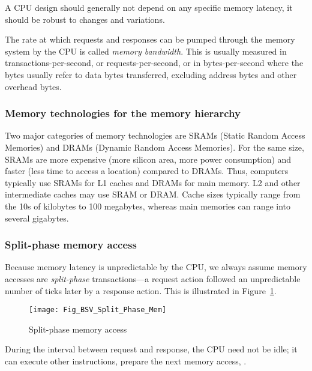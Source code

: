 A CPU design should generally not depend on any specific memory
latency, {\ie} it should be robust to changes and variations.


The rate at which requests and responses can be pumped through the
memory system by the CPU is called \emph{memory bandwidth}.  This is
usually measured in transactions-per-second, or requests-per-second,
or in bytes-per-second where the bytes usually refer to data bytes
transferred, excluding address bytes and other overhead bytes.


\subsubsection{Memory technologies for the memory hierarchy}



Two major categories of memory technologies are SRAMs (Static Random
Access Memories) and DRAMs (Dynamic Random Access Memories).  For the
same size, SRAMs are more expensive (more silicon area, more power
consumption) and faster (less time to access a location) compared to
DRAMs.  Thus, computers typically use SRAMs for L1 caches and DRAMs
for main memory. L2 and other intermediate caches may use SRAM or
DRAM.  Cache sizes typically range from the 10s of kilobytes to 100
megabytes, whereas main memories can range into several gigabytes.


\subsubsection{Split-phase memory access}



Because memory latency is unpredictable by the CPU, we always assume
memory accesses are \emph{split-phase} transactions---a request action
followed an unpredictable number of ticks later by a response action.
This is illustrated in Figure~\ref{Fig_BSV_Split_Phase_Mem}.
\begin{figure}[htbp]
  \centerline{\texttt{[image: Fig\_BSV\_Split\_Phase\_Mem]}}
  \caption{\label{Fig_BSV_Split_Phase_Mem} Split-phase memory access}
\end{figure}
During the interval between request and response, the CPU need not be
idle; it can execute other instructions, prepare the next memory
access, {\etc}.

